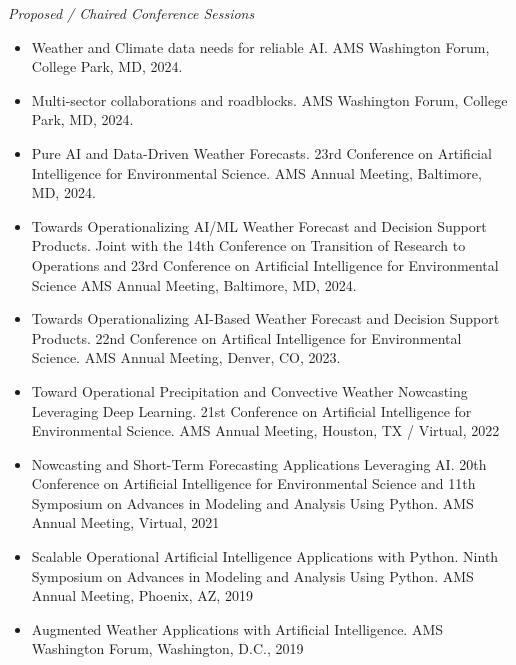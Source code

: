 \documentclass[11pt,letterpaper]{article}
\begin{document}
\bigskip
\emph{Proposed / Chaired Conference Sessions}
\medskip
\begin{itemize}[itemindent=-10pt]

 \item Weather and Climate data needs for reliable AI. AMS Washington Forum, College Park, MD, 2024.
 
 \item Multi-sector collaborations and roadblocks. AMS Washington Forum, College Park, MD, 2024.

 \item Pure AI and Data-Driven Weather Forecasts. 23rd Conference on Artificial Intelligence for Environmental Science. AMS Annual Meeting, Baltimore, MD, 2024.

 \item Towards Operationalizing AI/ML Weather Forecast and Decision Support Products. Joint with the 14th Conference on Transition of Research to Operations and 23rd Conference on Artificial Intelligence for Environmental Science AMS Annual Meeting, Baltimore, MD, 2024.

 \item Towards Operationalizing AI-Based Weather Forecast and Decision Support Products. 22nd Conference on Artifical Intelligence for Environmental Science. AMS Annual Meeting, Denver, CO, 2023.

 \item Toward Operational Precipitation and Convective Weather Nowcasting Leveraging Deep Learning. 21st Conference on Artificial Intelligence for Environmental Science. AMS Annual Meeting, Houston, TX / Virtual, 2022

 \item Nowcasting and Short-Term Forecasting Applications Leveraging AI. 20th Conference on Artificial Intelligence for Environmental Science and 11th Symposium on Advances in Modeling and Analysis Using Python. AMS Annual Meeting, Virtual, 2021

 \item Scalable Operational Artificial Intelligence Applications with Python. Ninth Symposium on Advances in Modeling and Analysis Using Python. AMS Annual Meeting, Phoenix, AZ, 2019
 
 \item Augmented Weather Applications with Artificial Intelligence. AMS Washington Forum, Washington, D.C., 2019
 

\end{itemize}
\end{document}
